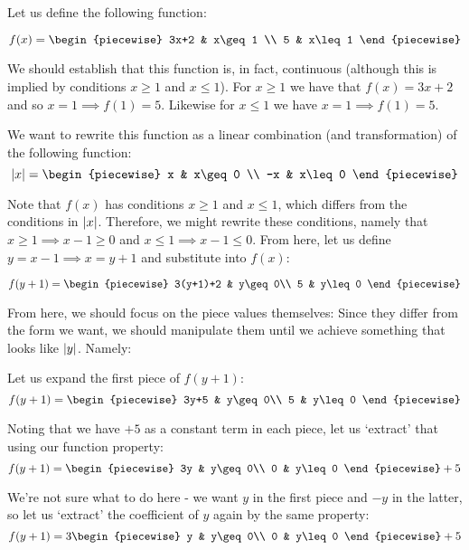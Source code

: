 \begin{example}
    Let us define the following function:

    $$
        f(x)=\begin{piecewise}
            3x+2 & x\geq 1 \\
            5 & x\leq 1
        \end{piecewise}
    $$

    We should establish that this function is, in fact, continuous (although this is implied by conditions $x\geq 1$ and $x\leq 1$). For $x\geq 1$ we have that $f(x)=3x+2$ and so $x=1\implies f(1)=5$. Likewise for $x\leq 1$ we have $x=1\implies f(1)=5$.

    We want to rewrite this function as a linear combination (and transformation) of the following function:
    $$
        \abs{x}=\begin{piecewise}
            x & x\geq 0 \\
            -x & x\leq 0
        \end{piecewise}
    $$

    Note that $f(x)$ has conditions $x\geq 1$ and $x\leq 1$, which differs from the conditions in $\abs{x}$. Therefore, we might rewrite these conditions, namely that $x\geq 1\implies x-1\geq 0$ and $x\leq 1\implies x-1\leq 0$. From here, let us define $y=x-1\implies x=y+1$ and substitute into $f(x)$:

    $$
        f(y+1)=\begin{piecewise}
            3(y+1)+2 & y\geq 0\\
            5 & y\leq 0
        \end{piecewise}
    $$

    From here, we should focus on the piece values themselves: Since they differ from the form we want, we should manipulate them until we achieve something that looks like $\abs{y}$. Namely:

    Let us expand the first piece of $f(y+1)$:
    $$
        f(y+1) = \begin{piecewise}
            3y+5 & y\geq 0\\
            5 & y\leq 0
        \end{piecewise}
    $$

    Noting that we have $+5$ as a constant term in each piece, let us `extract' that using our function property:
    $$
        f(y+1) = \begin{piecewise}
            3y & y\geq 0\\
            0 & y\leq 0
        \end{piecewise}+5
    $$

    We're not sure what to do here - we want $y$ in the first piece and $-y$ in the latter, so let us `extract' the coefficient of $y$ again by the same property:
    $$
        f(y+1) = 3\begin{piecewise}
            y & y\geq 0\\
            0 & y\leq 0
        \end{piecewise}+5
    $$
    \addtocounter{example}{-1}
\end{example}
